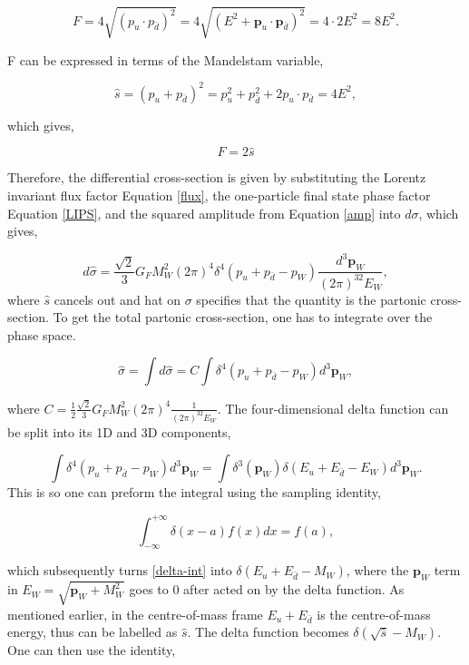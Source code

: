 \documentclass[a4paper,11pt]{article}
\begin{document}
$$ F = 4\sqrt{(p_u \cdot p_{\bar{d}})^2} = 4\sqrt{(E^2 + \boldsymbol{p}_u\cdot\boldsymbol{p}_{\bar{d}})^2} =4\cdot 2E^2 =8E^2.$$

F can be expressed in terms of the Mandelstam variable, 

$$ \hat{s} = (p_u+ p_{\bar{d}})^2 = p_u^2 + p_{\bar{d}}^2 +2p_u\cdot p_{\bar{d}} = 4E^2, $$

which gives,

\begin{equation}\label{flux}
	F = 2\hat{s}
\end{equation}

Therefore, the differential cross-section is given by substituting the Lorentz invariant flux factor Equation \ref{flux}, the one-particle final state phase factor Equation \ref{LIPS}, and the squared amplitude from Equation \ref{amp} into $d\sigma$, which gives,

\begin{equation}\label{dsigma}
		d\hat{\sigma}  =\frac{\sqrt{2}}{3}G_F M_W^2 (2\pi)^4 \delta^4(p_u +p_{\bar{d}} - p_W) \frac{d^3\boldsymbol{p}_W}{(2\pi)^32E_W},
\end{equation}
where $\hat{s}$ cancels out and hat on $\sigma$ specifies that the quantity is the partonic cross-section. To get the total partonic  cross-section, one has to integrate over the phase space.

$$\hat{\sigma} = \int d\hat{\sigma} = C \int \delta^4(p_u +p_{\bar{d}} - p_W) d^3\boldsymbol{p}_W, $$

where $C =\frac{1}{2}\frac{\sqrt{2}}{3}G_FM^2_W(2\pi)^4\frac{1}{(2\pi)^32E_W} $. The four-dimensional delta function can be split into its 1D and 3D components,

\begin{equation}\label{delta-int}
	\int \delta^4(p_u +p_{\bar{d}} - p_W) d^3\boldsymbol{p}_W = \int \delta^3(\boldsymbol{p}_W)\delta(E_u + E_{\bar{d}} - E_W) d^3\boldsymbol{p}_W.
\end{equation}
This is so one can preform the integral using the sampling identity,

$$\int_{-\infty}^{+\infty} \delta(x-a)f(x) dx = f(a),$$

which subsequently  turns \ref{delta-int} into $\delta(E_u + E_{\bar{d}} - M_W)$, where the $\boldsymbol{p}_W$ term in $E_W = \sqrt{\boldsymbol{p}_W+ M^2_W}$ goes to 0 after acted on by the delta function. As mentioned earlier, in the centre-of-mass frame $E_u + E_{\bar{d}}$ is the centre-of-mass energy, thus can be labelled as $\hat{s}$. The delta function becomes $\delta(\sqrt{\hat{s}} - M_W)$. One can then use the identity,
\end{document}
